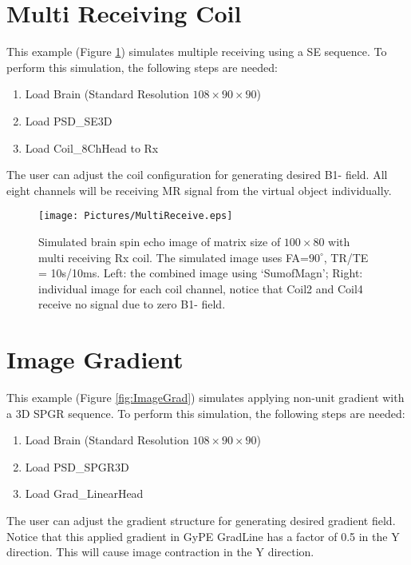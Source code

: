\documentclass{book}%
\begin{document}
\section{Multi Receiving Coil}

This example (Figure \ref{fig:MultiReceive}) simulates multiple receiving using a SE sequence. To perform this simulation, the following steps are needed:

\begin{enumerate}
	\item Load Brain (Standard Resolution $108 \times 90 \times 90$)
  \item Load PSD\_SE3D
	\item Load Coil\_8ChHead to Rx
\end{enumerate}

The user can adjust the coil configuration for generating desired B1- field. All eight channels will be receiving MR signal from the virtual object individually.

\begin{figure}[htbp]
	\centering
		\texttt{[image: Pictures/MultiReceive.eps]}
	\caption{Simulated brain spin echo image of matrix size of $100 \times 80$ with multi receiving Rx coil. The simulated image uses FA=$90^{\circ}$, TR/TE = 10s/10ms. Left: the combined image using `SumofMagn'; Right: individual image for each coil channel, notice that Coil2 and Coil4 receive no signal due to zero B1- field.}
	\label{fig:MultiReceive}
\end{figure}


\section{Image Gradient}

This example (Figure \ref{fig:ImageGrad}) simulates applying non-unit gradient with a 3D SPGR sequence. To perform this simulation, the following steps are needed:

\begin{enumerate}
	\item Load Brain (Standard Resolution $108 \times 90 \times 90$)
  \item Load PSD\_SPGR3D
	\item Load Grad\_LinearHead
\end{enumerate}

The user can adjust the gradient structure for generating desired gradient field. Notice that this applied gradient in GyPE GradLine has a factor of 0.5 in the Y direction. This will cause image contraction in the Y direction.
\end{document}
